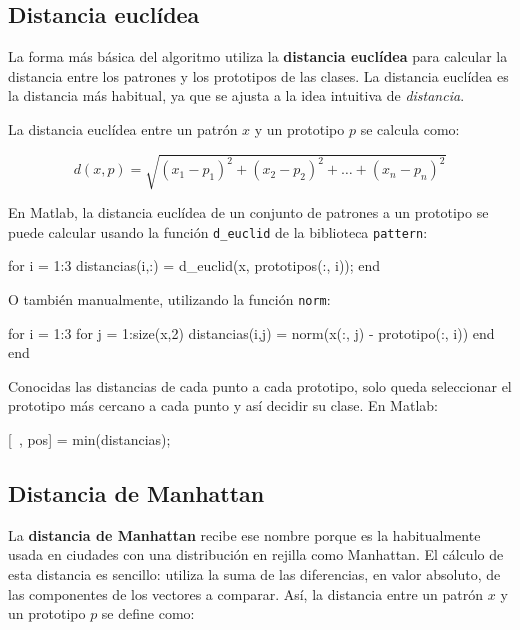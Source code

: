 \documentclass[11pt]{scrartcl}
\begin{document}
\subsection{Distancia euclídea}

La forma más básica del algoritmo utiliza la \textbf{distancia euclídea} para
calcular la distancia entre los patrones y los prototipos de las clases. La
distancia euclídea es la distancia más habitual, ya que se ajusta a la idea
intuitiva de \textit{distancia}.

La distancia euclídea entre un patrón $x$ y un prototipo $p$ se calcula como:

$$
d(x,p) = \sqrt{(x_1 - p_1)^2 + (x_2 - p_2)^2 + \dots + (x_n - p_n)^2}
$$

En Matlab, la distancia euclídea de un conjunto de patrones a un prototipo se
puede calcular usando la función \texttt{d\_euclid} de la biblioteca
\texttt{pattern}:

\begin{matlabcode}
for i = 1:3
  distancias(i,:) = d_euclid(x, prototipos(:, i));
end
\end{matlabcode}

O también manualmente, utilizando la función \texttt{norm}:

\begin{matlabcode}
for i = 1:3
  for j = 1:size(x,2)
    distancias(i,j) = norm(x(:, j) - prototipo(:, i))
  end
end
\end{matlabcode}

Conocidas las distancias de cada punto a cada prototipo, solo queda seleccionar
el prototipo más cercano a cada punto y así decidir su clase. En Matlab:

\begin{matlabcode}
[~, pos] = min(distancias);  
\end{matlabcode}

\subsection{Distancia de Manhattan}

La \textbf{distancia de Manhattan} recibe ese nombre porque es la habitualmente
usada en ciudades con una distribución en rejilla como Manhattan. El cálculo de
esta distancia es sencillo: utiliza la suma de las diferencias, en valor
absoluto, de las componentes de los vectores a comparar. Así, la distancia entre
un patrón $x$ y un prototipo $p$ se define como:
\end{document}
